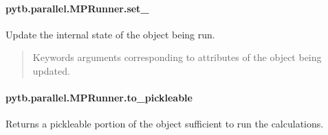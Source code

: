 \documentclass[letterpaper,10pt,english,openany,oneside]{sphinxmanual}
\begin{document}
\begin{fulllineitems}
\begin{fulllineitems}
\begin{quote}
\begin{description}
\end{description}\end{quote}

\end{fulllineitems}


\sphinxstepscope


\paragraph{pytb.parallel.MPRunner.set\_}
\label{\detokenize{api/pytb.parallel.MPRunner.set_:pytb-parallel-mprunner-set}}\label{\detokenize{api/pytb.parallel.MPRunner.set_::doc}}

\begin{fulllineitems}
\label{\detokenize{api/pytb.parallel.MPRunner.set_:pytb.parallel.MPRunner.set_}}
\pysigstartsignatures
{}
\pysigstopsignatures
\sphinxAtStartPar
Update the internal state of the object being run.
\begin{quote}\begin{description}
\sphinxAtStartPar
{} \textendash{} Keywords arguments corresponding to attributes of the object
being updated.

\end{description}\end{quote}

\end{fulllineitems}


\sphinxstepscope


\paragraph{pytb.parallel.MPRunner.to\_pickleable}
\label{\detokenize{api/pytb.parallel.MPRunner.to_pickleable:pytb-parallel-mprunner-to-pickleable}}\label{\detokenize{api/pytb.parallel.MPRunner.to_pickleable::doc}}

\begin{fulllineitems}
\label{\detokenize{api/pytb.parallel.MPRunner.to_pickleable:pytb.parallel.MPRunner.to_pickleable}}
\pysigstartsignatures
{}
\pysigstopsignatures
\sphinxAtStartPar
Returns a pickle\sphinxhyphen{}able portion of the object sufficient to run
the calculations.

\end{fulllineitems}


\end{fulllineitems}
\end{document}
